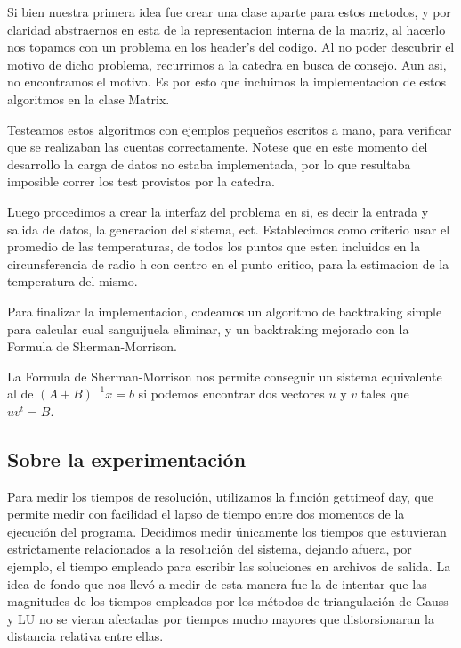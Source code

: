 Si bien nuestra primera idea fue crear una clase aparte para estos metodos, y por claridad abstraernos en esta de la 
representacion interna de la matriz, al hacerlo nos topamos con un problema en los header's del codigo. Al no poder descubrir el motivo
de dicho problema, recurrimos a la catedra en busca de consejo. Aun asi, no encontramos el motivo. Es por esto que incluimos la implementacion de
estos algoritmos en la clase Matrix. 

Testeamos estos algoritmos con ejemplos peque\~nos escritos a mano, para verificar que se realizaban las cuentas correctamente. Notese que en 
este momento del desarrollo la carga de datos no estaba implementada, por lo que resultaba imposible correr los test provistos por la catedra.

Luego procedimos a crear la interfaz del problema en si, es decir la entrada y salida de datos, la generacion
del sistema, ect. Establecimos como criterio usar el promedio de las temperaturas, de todos los puntos que esten
incluidos en la circunsferencia de radio h con centro en el punto critico,
para la estimacion de la temperatura del mismo. 

Para finalizar la implementacion, codeamos un algoritmo de backtraking simple para calcular cual sanguijuela eliminar,
y un backtraking mejorado con la Formula de Sherman-Morrison. 

La Formula de Sherman-Morrison nos permite conseguir un sistema equivalente al de $(A+B)^{-1}x=b$ si podemos encontrar dos vectores $u$ y $v$
tales que $uv^t=B$.




\subsection{Sobre la experimentaci\'on}

Para medir los tiempos de resoluci\'on, utilizamos la funci\'on gettimeof day, que permite medir con
facilidad el lapso de tiempo entre dos momentos de la ejecuci\'on del programa. Decidimos medir
\'unicamente los tiempos que estuvieran estrictamente relacionados a la resoluci\'on del sistema,
dejando afuera, por ejemplo, el tiempo empleado para escribir las soluciones en archivos de salida. La
idea de fondo que nos llev\'o a medir de esta manera fue la de intentar que las magnitudes de los tiempos
empleados por los m\'etodos de triangulaci\'on de Gauss y LU no se vieran afectadas por tiempos mucho
mayores que distorsionaran la distancia relativa entre ellas.

